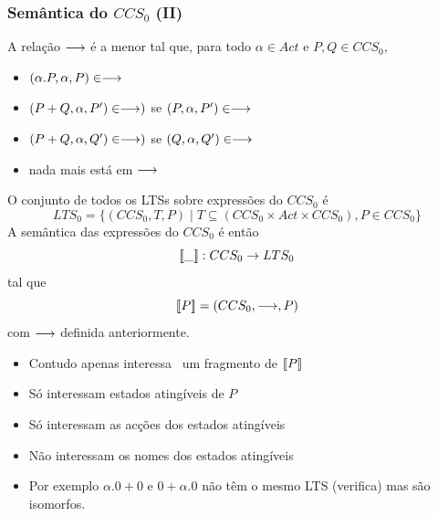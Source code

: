 \documentclass[aspectratio=169]{beamer}
\begin{document}
\begin{frame}
\frametitle{Semântica do $CCS_0$ (II)}

A relação $\longrightarrow$ é a menor tal que, para todo $\alpha\in Act$ e $P,Q\in CCS_0$,
\begin{itemize}
	\item  $(\alpha.P,\alpha,P)\in \longrightarrow$
\item    $(P+Q,\alpha,P')\in \longrightarrow)$ se $(P,\alpha,P')\in \longrightarrow$
\item    $(P+Q,\alpha,Q')\in \longrightarrow)$ se $(Q,\alpha,Q')\in \longrightarrow$
\item nada mais está em $\longrightarrow$
\end{itemize}

\end{frame}


\begin{frame}
O conjunto de todos os LTSs sobre expressões do $CCS_0$ é 
$$LTS_0 = \{(CCS_0,T,P)\mid T\subseteq (CCS_0\times Act\times CCS_0), P\in CCS_0\}$$
A semântica das expressões do $CCS_0$ é então $$[\![ \_ ]\!]: CCS_0\rightarrow LTS_0$$ tal que $$[\![ P ]\!]=(CCS_0,\longrightarrow,P)$$ com $\longrightarrow$ definida anteriormente.
\end{frame}
\begin{frame}
\begin{itemize}
	\item Contudo apenas interessa  um fragmento de $[\![ P ]\!]$
\item Só interessam estados atingíveis de $P$
\item Só interessam as acções dos estados atingíveis
\item  Não interessam os nomes dos estados atingíveis
\item Por exemplo $\alpha.0+0$ e $0+\alpha.0$ não têm o mesmo LTS  (verifica) mas são \alert{isomorfos}.
\end{itemize}
\end{frame}
\end{document}
